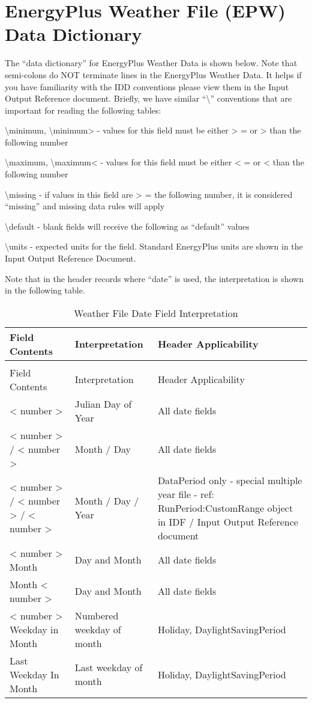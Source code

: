 \section{EnergyPlus Weather File (EPW) Data Dictionary}\label{energyplus-weather-file-epw-data-dictionary}

The ``data dictionary'' for EnergyPlus Weather Data is shown below. Note that semi-colons do NOT terminate lines in the EnergyPlus Weather Data. It helps if you have familiarity with the IDD conventions please view them in the Input Output Reference document. Briefly, we have similar ``\textbackslash{}'' conventions that are important for reading the following tables:

\textbackslash{}minimum, \textbackslash{}minimum\textgreater{} - values for this field must be either \textgreater{} = or \textgreater{} than the following number

\textbackslash{}maximum, \textbackslash{}maximum\textless{} - values for this field must be either \textless{} = or \textless{} than the following number

\textbackslash{}missing - if values in this field are \textgreater{} = the following number, it is considered ``missing'' and missing data rules will apply

\textbackslash{}default - blank fields will receive the following as ``default'' values

\textbackslash{}units - expected units for the field. Standard EnergyPlus units are shown in the Input Output Reference Document.

Note that in the header records where ``date'' is used, the interpretation is shown in the following table.

\begin{longtable}[c]{p{1.5in}p{1.5in}p{2.99in}}
\caption{Weather File Date Field Interpretation \label{table:weather-file-date-field-interpretation}} \tabularnewline
\toprule 
Field Contents & Interpretation & Header Applicability \tabularnewline
\midrule
\endfirsthead

\caption[]{Weather File Date Field Interpretation} \tabularnewline
\toprule 
Field Contents & Interpretation & Header Applicability \tabularnewline
\midrule
\endhead

< number > & Julian Day of Year & All date fields \tabularnewline
< number >  /  < number > & Month / Day & All date fields \tabularnewline
< number >  /  < number >  /  < number > & Month / Day / Year & DataPeriod only - special multiple year file - ref: RunPeriod:CustomRange object in IDF / Input Output Reference document \tabularnewline
< number >  Month & Day and Month & All date fields \tabularnewline
Month  < number > & Day and Month & All date fields \tabularnewline
< number >  Weekday in Month & Numbered weekday of month & Holiday, DaylightSavingPeriod \tabularnewline
Last Weekday In Month & Last weekday of month & Holiday, DaylightSavingPeriod \tabularnewline
\bottomrule
\end{longtable}

